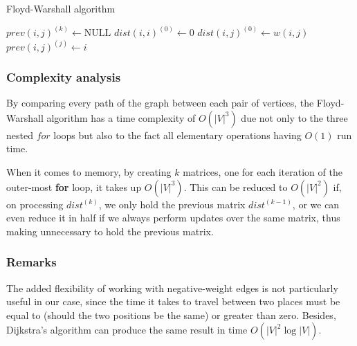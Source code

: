 \begin{algorithm}[ht]
    \caption{Floyd-Warshall algorithm}
    \label{alg:floyd-warshall}
    \begin{algorithmic}[1]
             
                 {$prev(i,j)^{(k)} \gets \text{NULL}$}
                \EndFor
            \EndFor
             $dist(i,i)^{(0)} \gets 0$
            \EndFor
             
                \State $dist(i,j)^{(0)} \gets w(i,j)$
                \State $prev(i,j)^{(j)} \gets i$
            \EndFor
             
                    \EndIf
                \EndFor
            \EndFor
            \State {}
        \EndFunction
    \end{algorithmic}
\end{algorithm}

\subsubsection{Complexity analysis}
By comparing every path of the graph between each pair of vertices, the Floyd-Warshall algorithm has a time complexity of $O(|V|^3)$ due not only to the three nested $for$ loops but also to the fact all elementary operations having $O(1)$ run time.\par
When it comes to memory, by creating $k$ matrices, one for each iteration of the outer-most \textbf{for} loop, it takes up $O(|V|^3)$. This can be reduced to $O(|V|^2)$ if, on processing $dist^{(k)}$, we only hold the previous matrix $dist^{(k-1)}$, or we can even reduce it in half if we always perform updates over the same matrix, thus making unnecessary to hold the previous matrix.

\subsubsection{Remarks}
The added flexibility of working with negative-weight edges is not particularly useful in our case, since the time it takes to travel between two places must be equal to (should the two positions be the same) or greater than zero. Besides, Dijkstra's algorithm can produce the same result in time $O(|V|^2 \log {|V|})$.